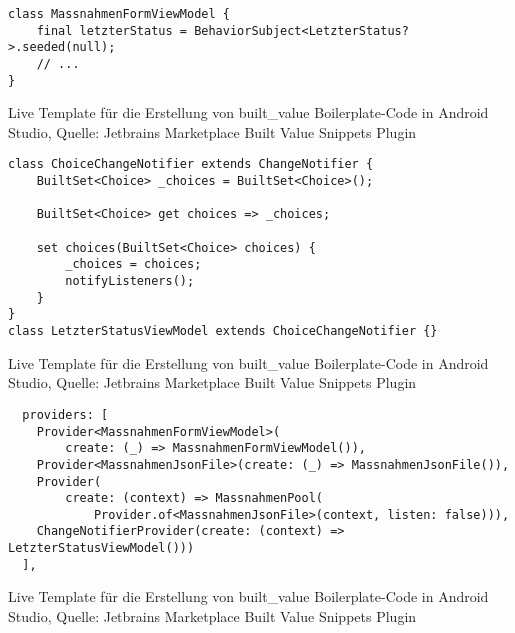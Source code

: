 

\ifincludeall
  \begin{listing}[h]
    \begin{verbatim}
class MassnahmenFormViewModel {
    final letzterStatus = BehaviorSubject<LetzterStatus?>.seeded(null);
    // ...
}
\end{verbatim}
    \caption[built_value Live Template]{Live Template für die Erstellung von built_value Boilerplate-Code in Android Studio, Quelle: Jetbrains Marketplace Built Value Snippets Plugin}
    \label{lst:BuiltValueLiveTemplate}
  \end{listing}
\fi

\ifincludeall
  \begin{listing}[h]
    \begin{verbatim}
class ChoiceChangeNotifier extends ChangeNotifier {
    BuiltSet<Choice> _choices = BuiltSet<Choice>();

    BuiltSet<Choice> get choices => _choices;

    set choices(BuiltSet<Choice> choices) {
        _choices = choices;
        notifyListeners();
    }
}
class LetzterStatusViewModel extends ChoiceChangeNotifier {}
\end{verbatim}
    \caption[built_value Live Template]{Live Template für die Erstellung von built_value Boilerplate-Code in Android Studio, Quelle: Jetbrains Marketplace Built Value Snippets Plugin}
    \label{lst:BuiltValueLiveTemplate}
  \end{listing}
\fi

\ifincludeall
  \begin{listing}[h]
    \begin{verbatim}
  providers: [
    Provider<MassnahmenFormViewModel>(
        create: (_) => MassnahmenFormViewModel()),
    Provider<MassnahmenJsonFile>(create: (_) => MassnahmenJsonFile()),
    Provider(
        create: (context) => MassnahmenPool(
            Provider.of<MassnahmenJsonFile>(context, listen: false))),
    ChangeNotifierProvider(create: (context) => LetzterStatusViewModel()))
  ],
\end{verbatim}
    \caption[built_value Live Template]{Live Template für die Erstellung von built_value Boilerplate-Code in Android Studio, Quelle: Jetbrains Marketplace Built Value Snippets Plugin}
    \label{lst:BuiltValueLiveTemplate}
  \end{listing}
\fi


